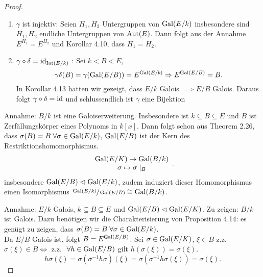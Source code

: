 \begin{proof}
	\begin{enumerate}[(1)]
		\item $\gamma$ ist injektiv: Seien $H_1, H_2$ Untergruppen von $\operatorname{Gal}(E / k)$ insbesondere sind $H_1, H_2$ endliche Untergruppen von $\operatorname{Aut}(E)$.
			Dann folgt aus der Annahme $E^{H_1} = E^{H_2}$  und Korollar 4.10, dass  $H_1 = H_2$.
		\item $\gamma \circ \delta = \operatorname{id}_{\operatorname{Int}(E / k)}$ : Sei $k < B < E$,
			\[
				\gamma \delta(B) =  \gamma(\operatorname{Gal}(E / B)) = E^{\operatorname{Gal}(E / b)} \Rightarrow E^{\operatorname{Gal}( E / B)} = B
			.\]
			In Korollar 4.13 hatten wir gezeigt, dass $E / k$ Galois $\implies E / B$ Galois. 
			Daraus folgt $\gamma \circ \delta = \operatorname{id}$ und schlussendlich ist $\gamma$ eine Bijektion
	\end{enumerate}
	Annahme: $B / k$ ist eine Galoiserweiterung. Insbesondere ist $k \subseteq B \subseteq E$ und $B$ ist Zerfällungskörper eines Polynoms in $k[x]$.
	Dann folgt schon aus Theorem 2.26, dass $\sigma(B) = B \forall \sigma \in \gal(E / k)$, $\operatorname{Gal}(E / B)$ ist der Kern des Restriktionshomomorphismus.
	\[
		\begin{array}{c} \operatorname{Gal}(E / K) \to \operatorname{Gal}( B / k)\\ \sigma \mapsto \sigma \mid_{B}\\ \end{array}
	.\] 
	insbesondere $\operatorname{Gal}(E / B) \vartriangleleft \operatorname{Gal}(E / k)$, zudem induziert dieser Homomorphismus einen Isomorphismus  $\sfrac{\operatorname{Gal}(E / k)}{\operatorname{Gal}(E / B)} \cong \operatorname{Gal}(B / k)$.

	Annahme: $E / k$ Galois, $k \subseteq B \subseteq E$ und $\operatorname{Gal}(E / B) \vartriangleleft \operatorname{Gal}(E / K)$. Zu zeigen: $B / k$ ist Galois. 
	Dazu benötigen wir die Charakterisierung von Proposition 4.14: es genügt zu zeigen, dass $\sigma(B) = B \forall \sigma \in \gal(E / k)$.\\
	Da $E / B$ Galois ist, folgt $B = E^{\operatorname{Gal}(E / B)}$.
	Sei $\sigma \in \operatorname{Gal}(E / K)$, $\xi \in B$ z.z. $\sigma(\xi) \in B \Leftrightarrow $ z.z. $\forall h \in \gal(E / B)$ gilt $h(\sigma(\xi)) = \sigma(\xi)$.
	\[
		h \sigma(\xi) = \sigma (\sigma^{-1} h \sigma)(\xi) = \sigma(\sigma^{-1} h \sigma(\xi)) = \sigma(\xi)
	.\] 
\end{proof}


